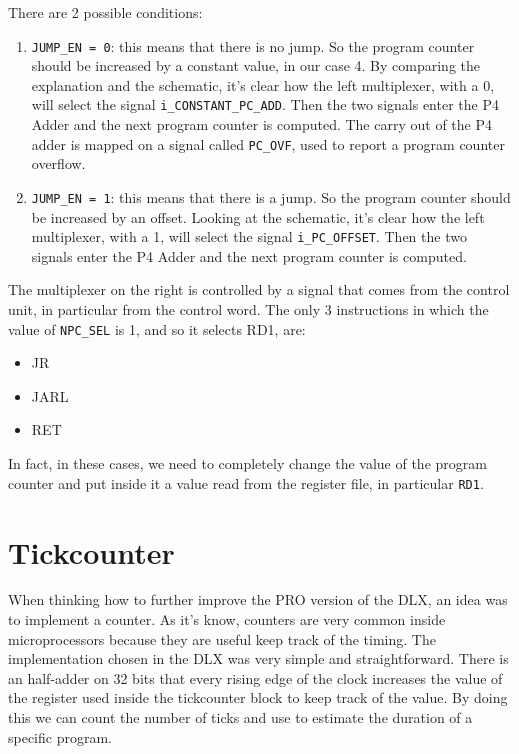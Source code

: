 There are 2 possible conditions:

\begin{enumerate}
  \item \texttt{JUMP\_EN = 0}: this means that there is no jump. So the program counter should be increased by a constant value, in our case 4. By comparing the explanation and the schematic, it's clear how the left multiplexer, with a 0, will select the signal \texttt{i\_CONSTANT\_PC\_ADD}. Then the two signals enter the P4 Adder and the next program counter is computed. The carry out of the P4 adder is mapped on a signal called \texttt{PC\_OVF}, used to report a program counter overflow. 
  \item \texttt{JUMP\_EN = 1}: this means that there is a jump. So the program counter should be increased by an offset. Looking at the schematic, it's clear how the left multiplexer, with a 1, will select the signal \texttt{i\_PC\_OFFSET}. Then the two signals enter the P4 Adder and the next program counter is computed. 
\end{enumerate}

The multiplexer on the right is controlled by a signal that comes from the control unit, in particular from the control word. The only 3 instructions in which the value of \texttt{NPC\_SEL} is 1, and so it selects RD1, are:

\begin{itemize}
  \item JR
  \item JARL
  \item RET
\end{itemize}

In fact, in these cases, we need to completely change the value of the program counter and put inside it a value read from the register file, in particular \texttt{RD1}.
\section{Tickcounter}
When thinking how to further improve the PRO version of the DLX, an idea was to implement a counter. As it's know, counters are very common inside microprocessors because they are useful keep track of the timing. 
The implementation chosen in the DLX was very simple and straightforward. There is an half-adder on 32 bits that every rising edge of the clock increases the value of the register used inside the tickcounter block to keep track of the value. By doing this we can count the number of ticks and use to estimate the duration of a specific program.
